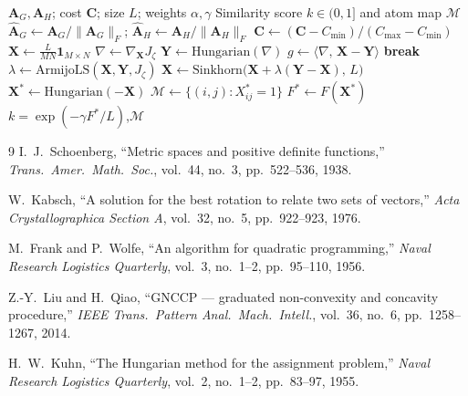 \documentclass[conference]{IEEEtran}
\begin{document}
{\small
\begin{algorithm}[H]
\caption{WCS-GNCCP with Frank-Wolfe}
\label{alg:gnccp-fw}
\begin{algorithmic}[1]
\REQUIRE $\mathbf{A}_G,\mathbf{A}_H$; cost $\mathbf{C}$;
  size $L$; weights $\alpha,\gamma$
\ENSURE Similarity score $k \!\in\! (0, 1]$
  and atom map $\mathcal{M}$
\STATE $\hat{\mathbf{A}}_G \leftarrow
  \mathbf{A}_G / \|\mathbf{A}_G\|_F$;\;
  $\hat{\mathbf{A}}_H \leftarrow
  \mathbf{A}_H / \|\mathbf{A}_H\|_F$
  \hfill{}
\STATE $\hat{\mathbf{C}} \leftarrow
  (\mathbf{C}\!-\!C_{\min})/(C_{\max}\!-\!C_{\min})$
\STATE $\mathbf{X} \leftarrow
  \frac{L}{MN}\mathbf{1}_{M\times N}$
  \hfill{}
    \STATE $\nabla \leftarrow
      \nabla_{\!\mathbf{X}} J_\zeta$
      \hfill{}
    \STATE $\mathbf{Y} \leftarrow
      \text{Hungarian}(\nabla)$
      \hfill{}
    \STATE $g \leftarrow
      \langle \nabla,\,\mathbf{X}\!-\!\mathbf{Y}\rangle$
      \hfill{}
      \STATE \textbf{break}
    \ENDIF
    \STATE $\lambda \leftarrow
      \text{ArmijoLS}(\mathbf{X},\mathbf{Y},J_\zeta)$
    \STATE $\mathbf{X} \leftarrow
      \text{Sinkhorn}\!\bigl(
        \mathbf{X}\!+\!\lambda(\mathbf{Y}\!-\!\mathbf{X}),\,L
      \bigr)$
      \hfill{}
  \ENDFOR
\ENDFOR
\STATE $\mathbf{X}^{\!*} \leftarrow
  \text{Hungarian}(-\mathbf{X})$
  \hfill{}
\STATE $\mathcal{M} \leftarrow
  \{(i,j) : X^*_{ij} = 1\}$
  \hfill{}
\STATE $F^{\!*} \leftarrow
  F(\mathbf{X}^{\!*})$
  \hfill{}
\RETURN $k = \exp(-\gamma F^{\!*}/L)$,\;$\mathcal{M}$
  \hfill{}
\end{algorithmic}
\end{algorithm}
}


\begin{thebibliography}{9}
I.~J.~Schoenberg,
``Metric spaces and positive definite functions,''
\textit{Trans.\ Amer.\ Math.\ Soc.},
vol.~44, no.~3, pp.~522--536, 1938.

W.~Kabsch,
``A solution for the best rotation to relate two sets of vectors,''
\textit{Acta Crystallographica Section A},
vol.~32, no.~5, pp.~922--923, 1976.

M.~Frank and P.~Wolfe,
``An algorithm for quadratic programming,''
\textit{Naval Research Logistics Quarterly},
vol.~3, no.~1--2, pp.~95--110, 1956.

Z.-Y.~Liu and H.~Qiao,
``GNCCP --- graduated non-convexity and concavity procedure,''
\textit{IEEE Trans.\ Pattern Anal.\ Mach.\ Intell.},
vol.~36, no.~6, pp.~1258--1267, 2014.

H.~W.~Kuhn,
``The Hungarian method for the assignment problem,''
\textit{Naval Research Logistics Quarterly},
vol.~2, no.~1--2, pp.~83--97, 1955.
\end{thebibliography}
\end{document}
